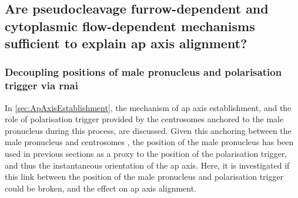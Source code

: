 

\FloatBarrier
\subsection{Are pseudocleavage furrow-dependent and cytoplasmic flow-dependent mechanisms sufficient to explain \acs{ap} axis alignment?}\label{subsec:sufficiencyTestAir1}

\subsubsection{Decoupling positions of male pronucleus and polarisation trigger via  \ac{rnai}}\label{subsubsec:air1rnaiDecoupleMalePronucleusPolarisation}
In \autoref{sec:ApAxisEstablishment}, the mechanism of \ac{ap} axis establishment, and the role of polarisation trigger provided by the centrosomes anchored to the male pronucleus during this process, are discussed. Given this anchoring between the male pronucleus and centrosomes \citep{de2016dynein}, the position of the male pronucleus has been used in previous sections as a proxy to the position of the polarisation trigger, and thus the instantaneous orientation of the \ac{ap} axis. Here, it is investigated if this link between the position of the male pronucleus and polarisation trigger could be broken, and the effect on \ac{ap} axis alignment.

